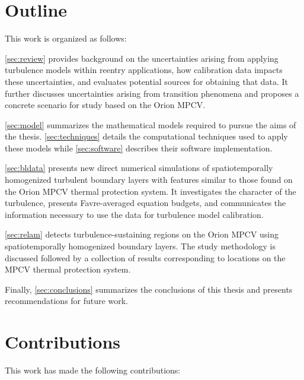 \section{Outline}

This work is organized as follows:

\autoref{sec:review} provides background on the uncertainties arising from
applying turbulence models within reentry applications, how calibration data
impacts these uncertainties, and evaluates potential sources for obtaining that
data.  It further discusses uncertainties arising from transition phenomena and
proposes a concrete scenario for study based on the Orion MPCV\@.

\autoref{sec:model} summarizes the mathematical models required to pursue
the aims of the thesis.  \autoref{sec:techniques} details the computational
techniques used to apply these models while \autoref{sec:software} describes
their software implementation.

\autoref{sec:bldata} presents new direct numerical simulations of
spatiotemporally homogenized turbulent boundary layers with features similar to
those found on the Orion MPCV thermal protection system.  It investigates
the character of the turbulence, presents Favre-averaged equation budgets,
and communicates the information necessary to use the data for turbulence
model calibration.

\autoref{sec:relam} detects turbulence-sustaining regions on the Orion MPCV
using spatiotemporally homogenized boundary layers.  The study methodology
is discussed followed by a collection of results corresponding to locations
on the MPCV thermal protection system.

Finally, \autoref{sec:conclusions} summarizes the conclusions of this thesis
and presents recommendations for future work.

\section{Contributions}

This work has made the following contributions:

